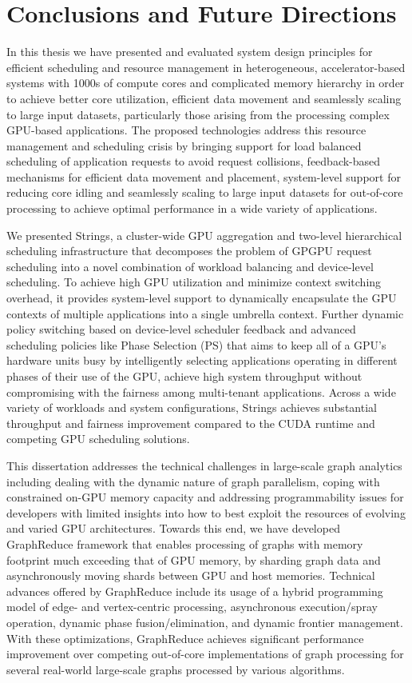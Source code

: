 \chapter{Conclusions and Future Directions}

In this thesis we have presented and evaluated system design principles for efficient scheduling and resource management in heterogeneous, accelerator-based systems with 1000s of compute cores and complicated memory hierarchy in order to achieve better core utilization, efficient data movement and seamlessly scaling to large input datasets, particularly those arising from the processing complex GPU-based applications. The proposed technologies address this resource management and scheduling crisis by bringing support for load balanced scheduling of application requests to avoid request collisions, feedback-based mechanisms for efficient data movement and placement, system-level support for reducing core idling and seamlessly scaling to large input datasets for out-of-core processing to achieve optimal performance in a wide variety of applications.

We presented Strings, a cluster-wide GPU aggregation and two-level hierarchical scheduling infrastructure that decomposes the problem of GPGPU request scheduling into a novel combination of workload balancing and device-level scheduling. To achieve high GPU utilization and minimize context switching overhead, it provides system-level support to dynamically encapsulate the GPU contexts of multiple applications into a single umbrella context.  Further dynamic policy switching based on device-level scheduler feedback and advanced scheduling  policies like Phase Selection (PS) that aims to keep all of a GPU’s hardware units busy by intelligently selecting applications operating in different phases of their use of the GPU, achieve high system throughput without compromising with the fairness among multi-tenant applications. Across a wide variety of workloads and system configurations,  Strings achieves substantial throughput and fairness improvement compared to the CUDA runtime and competing GPU scheduling solutions. 

This dissertation addresses the technical challenges in large-scale graph analytics including dealing with the dynamic nature of graph parallelism, coping with constrained on-GPU memory capacity and addressing programmability issues for developers with limited insights into how to best exploit the resources of evolving and varied GPU architectures. Towards this end, we have developed GraphReduce framework that enables processing of graphs with memory footprint much exceeding that of GPU memory, by sharding graph data and asynchronously moving shards between GPU and host memories. Technical advances offered by GraphReduce include its usage of a hybrid programming model of edge- and vertex-centric processing, asynchronous execution/spray operation, dynamic phase fusion/elimination, and dynamic frontier management. With these optimizations, GraphReduce achieves significant performance improvement over competing out-of-core implementations of graph processing  for several real-world large-scale graphs processed by various algorithms. 

